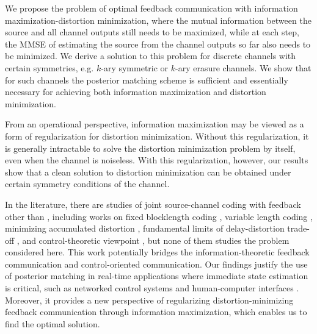 \documentclass{article}
\begin{document}
We propose the problem of optimal feedback communication with information maximization-distortion minimization, where the mutual information between the source and all channel outputs still needs to be maximized, while at each step, the MMSE of estimating the source from the channel outputs so far also needs to be minimized. We derive a solution to this problem for discrete channels with certain symmetries, e.g. $k$-ary symmetric or $k$-ary erasure channels. We show that for such channels the posterior matching scheme is sufficient and essentially necessary for achieving both information maximization and distortion minimization.


From an operational perspective, information maximization may be viewed as a form of regularization for distortion minimization. Without this regularization, it is generally intractable to solve the distortion minimization problem by itself, even when the channel is noiseless. With this regularization, however, our results show that a clean solution to distortion minimization can be obtained under certain symmetry conditions of the channel.


In the literature, there are studies of joint source-channel coding with feedback other than \cite{SchalkwijkKailath, Schalkwijk66, Horstein63, pm2011}, including works on fixed blocklength coding \cite{Gastpar_jscc_fb03}, variable length coding \cite{iter_fb02}, minimizing accumulated distortion \cite{dynamic_jscc_fb13}, fundamental limits of delay-distortion trade-off \cite{vic_pol_ver_jscc17}, and control-theoretic viewpoint \cite{control_comm_fb12}, but none of them studies the problem considered here.
This work potentially bridges the information-theoretic feedback communication and control-oriented communication. Our findings justify the use of posterior matching in real-time applications where immediate state estimation is critical, such as networked control systems \cite{anytime_capacity06} and human-computer interfaces \cite{coleman_hci}.
Moreover, it provides a new perspective of regularizing distortion-minimizing feedback communication through information maximization, which enables us to find the optimal solution.
\end{document}
